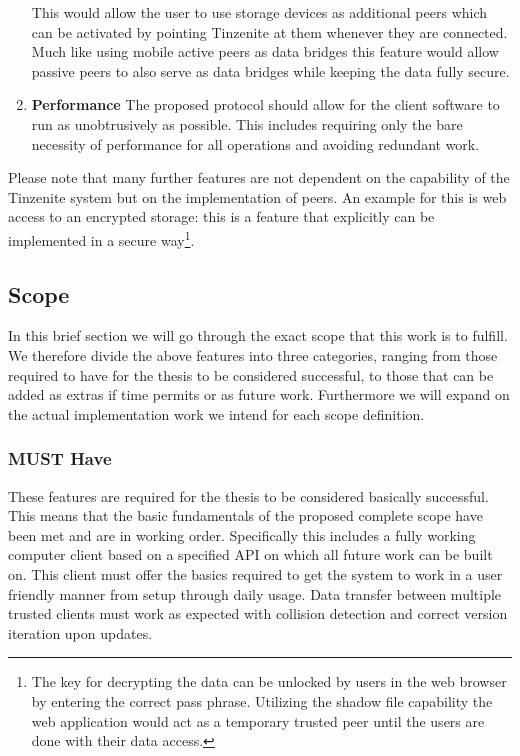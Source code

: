 \begin{enumerate}
    This would allow the user to use storage devices as additional peers which can be activated by pointing Tinzenite at them whenever they are connected.
    Much like using mobile active peers as data bridges this feature would allow passive peers to also serve as data bridges while keeping the data fully secure.
\item \textbf{Performance}
    The proposed protocol should allow for the client software to run as unobtrusively as possible.
    This includes requiring only the bare necessity of performance for all operations and avoiding redundant work.
\end{enumerate}

Please note that many further features are not dependent on the capability of the Tinzenite system but on the implementation of peers.
An example for this is web access to an encrypted storage: this is a feature that explicitly can be implemented in a secure way\footnote{The key for decrypting the data can be unlocked by users in the web browser by entering the correct pass phrase. Utilizing the shadow file capability the web application would act as a temporary trusted peer until the users are done with their data access.}.

\subsection{Scope}

In this brief section we will go through the exact scope that this work is to fulfill.
We therefore divide the above features into three categories, ranging from those required to have for the thesis to be considered successful, to those that can be added as extras if time permits or as future work.
Furthermore we will expand on the actual implementation work we intend for each scope definition.

\subsubsection{MUST Have}
\label{subs:MUST Have}

These features are required for the thesis to be considered basically successful.
This means that the basic fundamentals of the proposed complete scope have been met and are in working order.
Specifically this includes a fully working computer client based on a specified API on which all future work can be built on.
This client must offer the basics required to get the system to work in a user friendly manner from setup through daily usage.
Data transfer between multiple trusted clients must work as expected with collision detection and correct version iteration upon updates.

